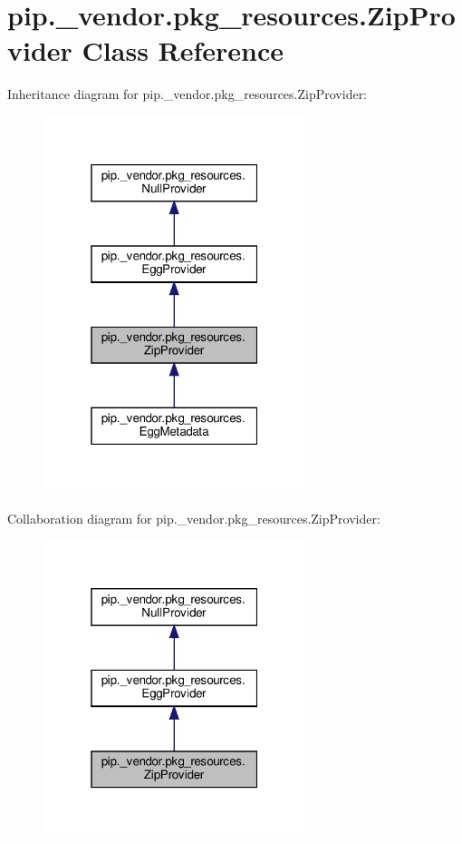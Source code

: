\hypertarget{classpip_1_1__vendor_1_1pkg__resources_1_1ZipProvider}{}\section{pip.\+\_\+vendor.\+pkg\+\_\+resources.\+Zip\+Provider Class Reference}
\label{classpip_1_1__vendor_1_1pkg__resources_1_1ZipProvider}


Inheritance diagram for pip.\+\_\+vendor.\+pkg\+\_\+resources.\+Zip\+Provider\+:
\nopagebreak
\begin{figure}[H]
\begin{center}
\leavevmode
\includegraphics[width=217pt]{classpip_1_1__vendor_1_1pkg__resources_1_1ZipProvider__inherit__graph}
\end{center}
\end{figure}


Collaboration diagram for pip.\+\_\+vendor.\+pkg\+\_\+resources.\+Zip\+Provider\+:
\nopagebreak
\begin{figure}[H]
\begin{center}
\leavevmode
\includegraphics[width=217pt]{classpip_1_1__vendor_1_1pkg__resources_1_1ZipProvider__coll__graph}
\end{center}
\end{figure}

